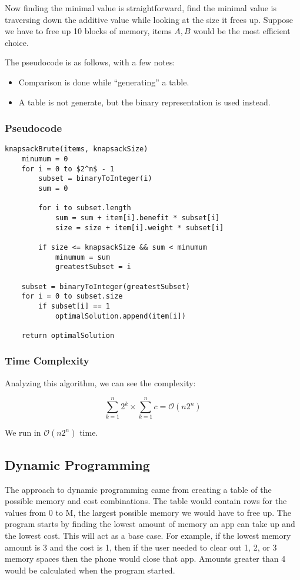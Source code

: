 \documentclass{article}
\begin{document}
Now finding the minimal value is straightforward, find the minimal value is traversing down the additive value while looking at the size it frees up. Suppose we have to free up 10 blocks of memory, items $A, B$ would be the most efficient choice.

The pseudocode is as follows, with a few notes:

\begin{itemize}
    \item Comparison is done while ``generating'' a table.
    \item A table is not generate, but the binary representation is used instead.
\end{itemize}

\subsubsection{Pseudocode}
\begin{lstlisting}[mathescape]
knapsackBrute(items, knapsackSize)
    minumum = 0
    for i = 0 to $2^n$ - 1
        subset = binaryToInteger(i)
        sum = 0

        for i to subset.length
            sum = sum + item[i].benefit * subset[i]
            size = size + item[i].weight * subset[i]

        if size <= knapsackSize && sum < minumum
            minumum = sum
            greatestSubset = i

    subset = binaryToInteger(greatestSubset)
    for i = 0 to subset.size
        if subset[i] == 1
            optimalSolution.append(item[i])

    return optimalSolution
\end{lstlisting}

\subsubsection{Time Complexity}
Analyzing this algorithm, we can see the complexity:

\begin{equation}
    \sum _{k = 1} ^{n} 2^k \times \sum _{k = 1} ^{n} c = \mathcal{O}(n 2^n)
\end{equation}

We run in $\mathcal{O}(n 2^n)$ time.

\subsection{Dynamic Programming}
The approach to dynamic programming came from creating a table of the possible memory and cost combinations. The table would contain rows for the values from 0 to M, the largest possible memory we would have to free up. The program starts by finding the lowest amount of memory an app can take up and the lowest cost. This will act as a base case. For example, if the lowest memory amount is 3 and the cost is 1, then if the user needed to clear out 1, 2, or 3 memory spaces then the phone would close that app. Amounts greater than 4 would be calculated when the program started.
\end{document}
